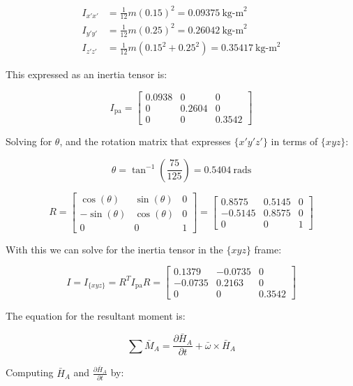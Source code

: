 \documentclass[12pt, letterpaper]{../assignment}
\begin{document}
\begin{equation*}
    \begin{aligned}
        I_{x'x'} &= \frac{1}{12} m \left( 0.15 \right)^2 = 0.09375 \ \text{kg-m}^2 \\
        I_{y'y'} &= \frac{1}{12} m \left( 0.25 \right)^2 = 0.26042 \ \text{kg-m}^2\\
        I_{z'z'} &= \frac{1}{12} m \left(0.15^2 +0.25^2 \right) = 0.35417 \ \text{kg-m}^2
    \end{aligned}
\end{equation*}

This expressed as an inertia tensor is:

$$ I_\text{pa} = \left[\begin{array}{ccc} 0.0938 & 0 & 0\\ 0 & 0.2604 & 0\\ 0 & 0 & 0.3542 \end{array}\right] $$

Solving for $\theta$, and the rotation matrix that expresses $\{x'y'z'\}$ in terms of $\{xyz\}$:

$$ \theta = \tan^{-1}\left(\frac{75}{125}\right) = 0.5404\ \text{rads} $$

$$ R = \left[\begin{array}{ccc} \cos\left(\theta \right) & \sin\left(\theta \right) & 0\\ -\sin\left(\theta \right) & \cos\left(\theta \right) & 0\\ 0 & 0 & 1 \end{array}\right]
= \left[\begin{array}{rrr} 0.8575 & 0.5145 & 0\\ -0.5145 & 0.8575 & 0\\ 0 & 0 & 1 \end{array}\right]$$

With this we can solve for the inertia tensor in the $\{xyz\}$ frame:

$$ I = I_{\{xyz\}} =  R^T I_\text{pa} R =
\left[\begin{array}{ccc} 0.1379 & -0.0735 & 0\\ -0.0735 & 0.2163 & 0\\ 0 & 0 & 0.3542 \end{array}\right] $$

The equation for the resultant moment is:

$$ \sum \bar{M}_A = \frac{\partial \bar{H}_A}{\partial t} + \bar{\omega} \times \bar{H}_A $$

Computing $\bar{H}_A$ and $\frac{\partial \bar{H}_A}{\partial t}$ by:
\end{document}

